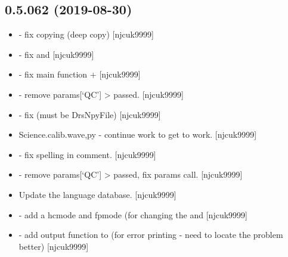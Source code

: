 \documentclass[a4paper,10pt,english]{report}
\begin{document}
\subsection{0.5.062 (2019-08-30)}
\label{\detokenize{misc/changelog:id80}}\begin{itemize}
\item {} 
 - fix copying (deep copy)
{[}njcuk9999{]}

\item {} 
 - fix  and  {[}njcuk9999{]}

\item {} 
 - fix main function  +  {[}njcuk9999{]}

\item {} 
 - remove params{[}‘QC’{]} \textendash{}\textgreater{} passed. {[}njcuk9999{]}

\item {} 
 - fix  (must be DrsNpyFile)
{[}njcuk9999{]}

\item {} 
Science.calib.wave,py - continue work to get  to
work. {[}njcuk9999{]}

\item {} 
 - fix spelling in comment. {[}njcuk9999{]}

\item {} 
 - remove params{[}‘QC’{]} \textendash{}\textgreater{} passed, fix 
params call. {[}njcuk9999{]}

\item {} 
Update the language database. {[}njcuk9999{]}

\item {} 
 - add a hcmode and
fpmode (for changing the  and  {[}njcuk9999{]}

\item {} 
 - add output function to  (for error
printing - need to locate the problem better) {[}njcuk9999{]}


\end{itemize}
\end{document}
